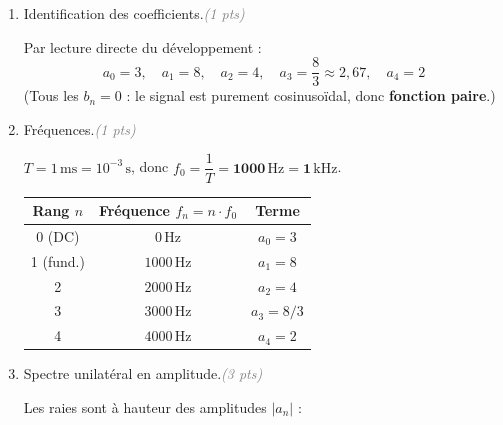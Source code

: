 \documentclass[a4paper,11pt]{article}
\newcommand{\reponse}[1]{%
  \begin{tcolorbox}[corrbox={}]
    #1
  \end{tcolorbox}%
}
\newcommand{\pts}[1]{\hfill\textcolor{gray}{\small\textit{(#1 pts)}}}
\begin{document}
\begin{enumerate}[label=\textbf{\arabic*.}, leftmargin=*, itemsep=0.4cm]

  \item Identification des coefficients.\pts{1}

  \reponse{
    Par lecture directe du développement :
    \[
      a_0 = 3, \quad a_1 = 8, \quad a_2 = 4, \quad a_3 = \frac{8}{3} \approx 2{,}67, \quad a_4 = 2
    \]
    (Tous les $b_n = 0$ : le signal est purement cosinusoïdal, donc \textbf{fonction paire}.)
  }

  \item Fréquences.\pts{1}

  \reponse{
    $T = 1\,\mathrm{ms} = 10^{-3}\,\mathrm{s}$, donc $f_0 = \dfrac{1}{T} = \mathbf{1000\,\mathrm{Hz} = 1\,\mathrm{kHz}}$.

    \medskip
    \begin{center}
    \begin{tabular}{|c|c|c|}
      \hline
      \textbf{Rang} $n$ & \textbf{Fréquence} $f_n = n\cdot f_0$ & \textbf{Terme}\\
      \hline
      0 (DC)   & $0\,\mathrm{Hz}$    & $a_0 = 3$ \\
      1 (fund.) & $1000\,\mathrm{Hz}$ & $a_1 = 8$ \\
      2         & $2000\,\mathrm{Hz}$ & $a_2 = 4$ \\
      3         & $3000\,\mathrm{Hz}$ & $a_3 = 8/3$ \\
      4         & $4000\,\mathrm{Hz}$ & $a_4 = 2$ \\
      \hline
    \end{tabular}
    \end{center}
  }

  \item Spectre unilatéral en amplitude.\pts{3}

  \reponse{
    Les raies sont à hauteur des amplitudes $|a_n|$ :

}
\end{enumerate}
\end{document}

